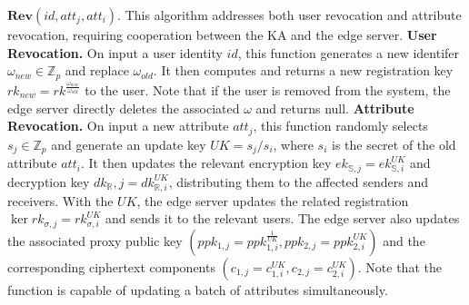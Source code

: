 \documentclass[runningheads]{llncs}
\begin{document}
$\mathbf{Rev}(id,att_j,att_i).$ This algorithm addresses both user revocation and attribute revocation, requiring cooperation between the KA and the edge server.
\textbf{User Revocation.} On input a user identity $id$, this function generates a new identifer $\omega_{new}\in\mathbb{Z}_p$ and replace $\omega_{old}.$ It then computes and returns a new registration key $rk_{new}=rk^{\frac{\omega_{new}}{\omega_{old}}}$ to the user. Note that if the user is removed from the system, the edge server directly deletes the associated $\omega$ and returns null.
\textbf{Attribute Revocation.} On input a new attribute $att_j$, this function randomly selects $s_j\in\mathbb{Z}_p$ and generate an update key $UK=s_j/s_i$, where $s_i$ is the secret of the old attribute $att_i.$ It then updates the relevant encryption key $ek_{\mathbb{S},j}=ek_{\mathbb{S},i}^{UK}$ and decryption key $dk_\mathbb{R},j=dk_{\mathbb{R},i}^{UK}$, distributing them to the affected senders and receivers. With the $UK$, the edge server updates the related registration $\ker rk_{\sigma,j}=rk_{\sigma,i}^{UK}$ and sends it to the relevant users. The edge server also updates the associated proxy public key $(ppk_{1,j}=ppk_{1,i}^{\frac1{UK}},ppk_{2,j}=ppk_{2,i}^{UK})$ and the corresponding ciphertext components $( c_{1, j}= c_{1, i}^{UK}, c_{2, j}= c_{2, i}^{UK}) .$ Note that the function is capable of updating a batch of attributes simultaneously.
\end{document}
